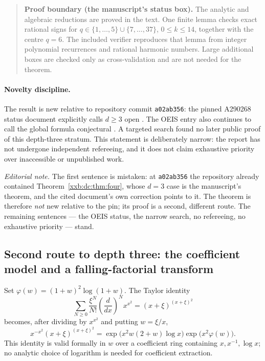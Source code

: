 \documentclass[11pt,a4paper]{article}
\numberwithin{equation}{section}
\theoremstyle{definition}
\theoremstyle{remark}
\theoremstyle{plain}
\begin{document}
\begin{quote}\small
\textbf{Proof boundary (the manuscript's status box).}
The analytic and algebraic reductions are proved in the text.  One finite
lemma checks exact rational signs for
$q\in\{1,\ldots,5\}\cup\{7,\ldots,37\}$, $0\leq k\leq14$,
together with the centre $q=6$.  The included verifier reproduces that lemma
from integer polynomial recurrences and rational harmonic numbers.  Large
additional boxes are checked only as cross-validation and are not needed for
the theorem.
\end{quote}

\paragraph{Novelty discipline.}
The result is new relative to repository commit \texttt{a02ab356}: the
pinned A290268 status document explicitly calls $d\geq3$ open
\cite{xxbd3-notes}.  The OEIS entry also continues to call the global
formula conjectural \cite{oeis290268}.  A targeted search found no later
public proof of this depth-three stratum.  This statement is deliberately
narrow: the report has not undergone independent refereeing, and it does not
claim exhaustive priority over inaccessible or unpublished work.

\emph{Editorial note.}  The first sentence is mistaken: at
\texttt{a02ab356} the repository already contained
Theorem~\ref{xxb:dc:thm:four}, whose $d=3$ case is the manuscript's theorem,
and the cited document's own correction points to it.  The theorem is
therefore \emph{not} new relative to the pin; its proof is a second, different
route.  The remaining sentences --- the OEIS status, the narrow search, no
refereeing, no exhaustive priority --- stand.

\subsection{Second route to depth three: the coefficient model and a falling-factorial transform}\label{xxb:d3:sec:model}

Set $\varphi(w)=(1+w)^2\log(1+w)$.  The Taylor identity
\[
 \sum_{N\geq0}\frac{\xi^N}{N!}
 \left(\frac{d}{dx}\right)^N x^{x^2}
 =(x+\xi)^{(x+\xi)^2}
\]
becomes, after dividing by $x^{x^2}$ and putting $w=\xi/x$,
\[
 x^{-x^2}(x+\xi)^{(x+\xi)^2}
 =\exp\!\bigl(x^2w(2+w)\log x\bigr)
   \exp\!\bigl(x^2\varphi(w)\bigr).
\]
This identity is valid formally in $w$ over a coefficient ring containing
$x,x^{-1},\log x$; no analytic choice of logarithm is needed for coefficient
extraction.
\end{document}
